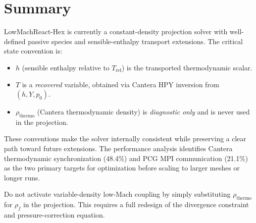 \documentclass[11pt]{article}
\begin{document}
\section{Summary}

LowMachReact-Hex is currently a constant-density projection solver with
well-defined passive species and sensible-enthalpy transport extensions.
The critical state convention is:
\begin{itemize}[leftmargin=*]
  \item $h$ (sensible enthalpy relative to $T_{\mathrm{ref}}$) is the
        transported thermodynamic scalar.
  \item $T$ is a \emph{recovered} variable, obtained via Cantera HPY
        inversion from $(h,Y,p_0)$.
  \item $\rho_{\mathrm{thermo}}$ (Cantera thermodynamic density) is
        \emph{diagnostic only} and is never used in the projection.
\end{itemize}

These conventions make the solver internally consistent while preserving
a clear path toward future extensions. The performance analysis identifies
Cantera thermodynamic synchronization (48.4\%) and PCG MPI communication
(21.1\%) as the two primary targets for optimization before scaling to
larger meshes or longer runs.

\begin{warnbox}
Do not activate variable-density low-Mach coupling by simply substituting
$\rho_{\mathrm{thermo}}$ for $\rho_f$ in the projection. This requires a
full redesign of the divergence constraint and pressure-correction equation.
\end{warnbox}
\end{document}
